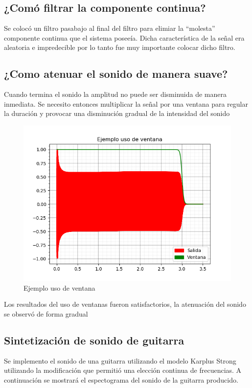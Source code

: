 \documentclass[assd_tp2_main.tex]{subfiles}
\begin{document}
\subsection{¿Comó filtrar la componente continua?}
Se colocó un filtro pasabajo al final del filtro para elimiar la ``molesta'' componente continua que el sistema poseeía. Dicha característica de la señal era aleatoria e impredecible por lo tanto fue muy importante colocar dicho filtro.

\subsection{¿Como atenuar el sonido de manera suave?}
Cuando termina el sonido la amplitud no puede ser disminuida de manera inmediata. Se necesito entonces multiplicar la señal por una ventana para regular la duración y provocar una disminución gradual de la intensidad del sonido

\begin{figure}[H]
	\begin{center}
	\includegraphics[scale=0.5]{graficos/ejemplo_uso_ventana.png}
	\caption{Ejemplo uso de ventana}

	\end{center}
\end{figure}
Los resultados del uso de ventanas fueron satisfactorios, la atenuación del sonido se observó de forma gradual

\subsection{Sintetización de sonido de guitarra}
Se implemento el sonido de una guitarra utilizando el modelo Karplus Strong utilizando la modificación que permitió una elección continua de frecuencias. A continuación se mostrará el espectograma del sonido de la guitarra producido.
\end{document}

